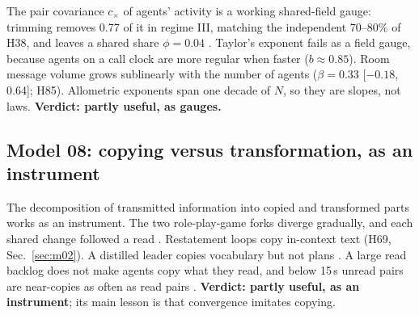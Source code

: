 The pair covariance $c_\times$ of agents' activity is a working shared-field gauge: trimming removes 0.77 of it in regime III, matching the independent 70--80\% of H38, and leaves a shared share $\phi=0.04$ . Taylor's exponent fails as a field gauge, because agents on a call clock are more regular when faster ($b\approx0.85$). Room message volume grows sublinearly with the number of agents ($\beta=0.33$ [$-0.18$, 0.64]; H85). Allometric exponents span one decade of $N$, so they are slopes, not laws. \textbf{Verdict: partly useful, as gauges.}

\subsection{Model 08: copying versus transformation, as an instrument}\label{sec:m08}

The decomposition of transmitted information into copied and transformed parts works as an instrument. The two role-play-game forks diverge gradually, and each shared change followed a read . Restatement loops copy in-context text (H69, Sec.~\ref{sec:m02}). A distilled leader copies vocabulary but not plans . A large read backlog does not make agents copy what they read, and below 15\,s unread pairs are near-copies as often as read pairs . \textbf{Verdict: partly useful, as an instrument}; its main lesson is that convergence imitates copying.
